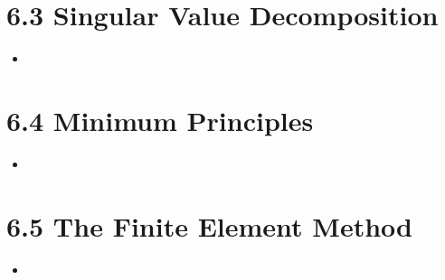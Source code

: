 \section{6.3 Singular Value Decomposition}
\begin{itemize}
  \item []


\end{itemize}

\section{6.4 Minimum Principles}
\begin{itemize}
  \item []


\end{itemize}

\section{6.5 The Finite Element Method}
\begin{itemize}
  \item []


\end{itemize}

